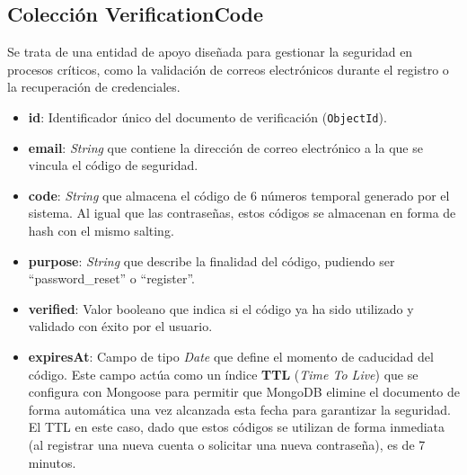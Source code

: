 \subsection{Colección VerificationCode}
Se trata de una entidad de apoyo diseñada para gestionar la seguridad en procesos críticos, como la validación de correos electrónicos durante el registro o la recuperación de credenciales.

\begin{itemize}
    \item \textbf{id}: Identificador único del documento de verificación (\texttt{ObjectId}).
    \item \textbf{email}: \textit{String} que contiene la dirección de correo electrónico a la que se vincula el código de seguridad.
    \item \textbf{code}: \textit{String} que almacena el código de 6 números temporal generado por el sistema. Al igual que las contraseñas, estos códigos se almacenan en forma de hash con el mismo salting.
    \item \textbf{purpose}: \textit{String} que describe la finalidad del código, pudiendo ser ``password\_reset'' o ``register''.
    \item \textbf{verified}: Valor booleano que indica si el código ya ha sido utilizado y validado con éxito por el usuario.
    \item \textbf{expiresAt}: Campo de tipo \textit{Date} que define el momento de caducidad del código. Este campo actúa como un índice \textbf{TTL} (\textit{Time To Live}) que se configura con Mongoose para permitir que MongoDB elimine el documento de forma automática una vez alcanzada esta fecha para garantizar la seguridad. El TTL en este caso, dado que estos códigos se utilizan de forma inmediata (al registrar una nueva cuenta o solicitar una nueva contraseña), es de 7 minutos.
\end{itemize}
